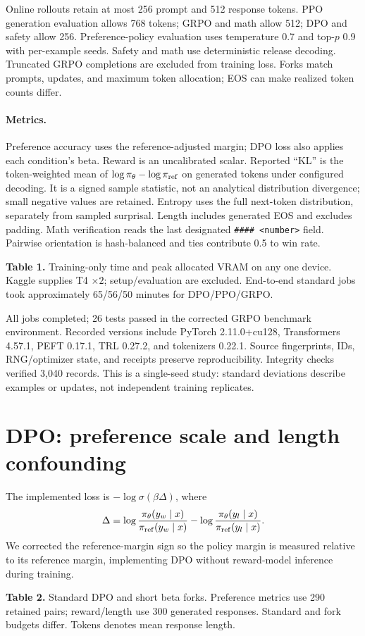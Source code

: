 \documentclass{article}
\begin{document}
Online rollouts retain at most 256 prompt and 512 response tokens. PPO generation evaluation allows 768 tokens; GRPO and math allow 512; DPO and safety allow 256. Preference-policy evaluation uses temperature 0.7 and top-$p$ 0.9 with per-example seeds. Safety and math use deterministic release decoding. Truncated GRPO completions are excluded from training loss. Forks match prompts, updates, and maximum token allocation; EOS can make realized token counts differ.

\paragraph{Metrics.} Preference accuracy uses the reference-adjusted margin; DPO loss also applies each condition's beta. Reward is an uncalibrated scalar. Reported ``KL'' is the token-weighted mean of $\log\pi_\theta-\log\pi_{\rm ref}$ on generated tokens under configured decoding. It is a signed sample statistic, not an analytical distribution divergence; small negative values are retained. Entropy uses the full next-token distribution, separately from sampled surprisal. Length includes generated EOS and excludes padding. Math verification reads the last designated \texttt{\#\#\#\# <number>} field. Pairwise orientation is hash-balanced and ties contribute 0.5 to win rate.


\noindent\textbf{Table 1.} Training-only time and peak allocated VRAM on any one device. Kaggle supplies T4 $\times2$; setup/evaluation are excluded. End-to-end standard jobs took approximately 65/56/50 minutes for DPO/PPO/GRPO.

All jobs completed; 26 tests passed in the corrected GRPO benchmark environment. Recorded versions include PyTorch 2.11.0+cu128, Transformers 4.57.1, PEFT 0.17.1, TRL 0.27.2, and tokenizers 0.22.1. Source fingerprints, IDs, RNG/optimizer state, and receipts preserve reproducibility. Integrity checks verified 3,040 records. This is a single-seed study: standard deviations describe examples or updates, not independent training replicates.
\clearpage

\section{DPO: preference scale and length confounding}
The implemented loss is $-\log\sigma(\beta\Delta)$, where
\[
\Delta=\log\frac{\pi_\theta(y_w\mid x)}{\pi_{\rm ref}(y_w\mid x)}-
\log\frac{\pi_\theta(y_l\mid x)}{\pi_{\rm ref}(y_l\mid x)}.
\]
We corrected the reference-margin sign so the policy margin is measured relative to its reference margin, implementing DPO \cite{dpo} without reward-model inference during training.

\noindent\textbf{Table 2.} Standard DPO and short beta forks. Preference metrics use 290 retained pairs; reward/length use 300 generated responses. Standard and fork budgets differ. Tokens denotes mean response length.
\end{document}
